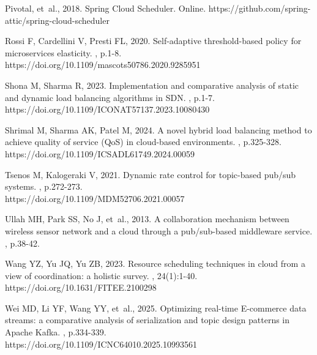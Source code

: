 \begin{thebibliography}{}
Pivotal, {et~al.}, 2018.
\newblock Spring Cloud Scheduler.
\newblock Online. https://github.com/spring-attic/spring-cloud-scheduler

Rossi F, Cardellini V, Presti FL, 2020.
\newblock Self-adaptive threshold-based policy for microservices elasticity.
, p.1-8. \\
https://doi.org/10.1109/mascots50786.2020.9285951

Shona M, Sharma R, 2023.
\newblock Implementation and comparative analysis of static and dynamic load balancing algorithms in SDN.
, p.1-7. \\
https://doi.org/10.1109/ICONAT57137.2023.10080430

Shrimal M, Sharma AK, Patel M, 2024.
\newblock A novel hybrid load balancing method to achieve quality of service (QoS) in cloud-based environments.
, p.325-328. \\
https://doi.org/10.1109/ICSADL61749.2024.00059

Tsenos M, Kalogeraki V, 2021.
\newblock Dynamic rate control for topic-based pub/sub systems.
, p.272-273. \\
https://doi.org/10.1109/MDM52706.2021.00057

Ullah MH, Park SS, No J, {et~al.}, 2013.
\newblock A collaboration mechanism between wireless sensor network and a cloud through a pub/sub-based middleware service.
, p.38-42.

Wang YZ, Yu JQ, Yu ZB, 2023.
\newblock Resource scheduling techniques in cloud from a view of coordination: a holistic survey.
, 24(1):1-40. \\
https://doi.org/10.1631/FITEE.2100298

Wei MD, Li YF, Wang YY, {et~al.}, 2025.
\newblock Optimizing real-time E-commerce data streams: a comparative analysis of serialization and topic design patterns in Apache Kafka.
, p.334-339. \\
https://doi.org/10.1109/ICNC64010.2025.10993561


\end{thebibliography}
